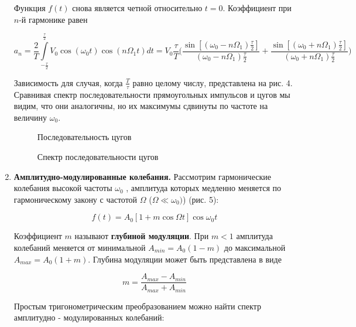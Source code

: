 \documentclass[a4paper,12pt]{article} %
\begin{document}
\begin{enumerate}
Функция $f(t)$ снова является четной относительно $t=0$. Коэффициент при $n$-й гармонике равен

\begin{equation}
    a_{n}=\dfrac{2}{T}\int\limits_{-\frac{\tau}{2}}^{\frac{\tau}{2}}V_{0}\cos(\omega_{0}t)\cos(n \Omega_{1} t)dt=V_{0}\dfrac{\tau}{T} \bigg(\dfrac{\sin[(\omega_{0}-n\Omega_{1})\frac{\tau}{2}]}{(\omega_{0}-n\Omega_{1})\frac{\tau}{2}}+\dfrac{\sin[(\omega_{0}+n\Omega_{1})\frac{\tau}{2}]}{(\omega_{0}+n\Omega_{1})\frac{\tau}{2}} \bigg)
\label{eq6}
\end{equation}
	
Зависимость для случая, когда $\frac{T}{\tau}$ равно целому числу, представлена на рис. 4. Сравнивая спектр последовательности прямоугольных импульсов и цугов мы видим, что они аналогичны, но их максимумы сдвинуты по частоте на величину $\omega_{0}$.
	
\begin{figure}[h]
    \begin{minipage}[h]{0.5\linewidth}
	\caption{Последовательность цугов}
    \end{minipage}
    \begin{minipage}[h]{0.5\linewidth}
	\caption{Спектр последовательности цугов}
    \end{minipage}
\end{figure}

\item \textbf{Амплитудно-модулированные колебания.} Рассмотрим гармонические колебания высокой частоты $\omega_{0}$ , амплитуда которых медленно меняется по гармоническому закону с частотой $\Omega$ ($\Omega \ll \omega_{0})$) (рис. 5):

\begin{equation}
    f(t)=A_{0}[1+m\cos\Omega t]\cos \omega_{0}t
\label{eq7}
\end{equation}	

Коэффициент $m$ называют \textbf{глубиной модуляции}. При $m<1$ амплитуда колебаний меняется от минимальной $A_{min}=A_{0}(1-m)$ до максимальной $A_{max}=A_{0}(1+m).$ Глубина модуляции может быть представлена в виде
	
\begin{equation}
	 m=\dfrac{A_{max}-A_{min}}{A_{max}+A_{min}}
\label{eq8}
\end{equation}
	
Простым тригонометрическим преобразованием можно найти спектр амплитудно - модулированных колебаний:


\end{enumerate}
\end{document}

